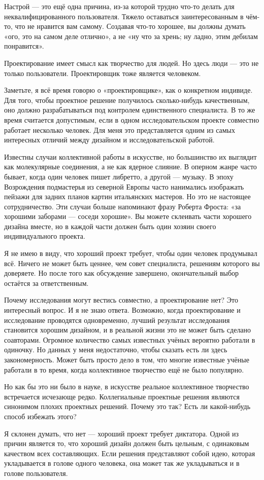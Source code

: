\documentclass[ebook,12pt,oneside,openany]{memoir}
\begin{document}
Настрой — это ещё одна причина, из-за которой трудно что-то делать для
неквалифицированного пользователя. Тяжело оставаться заинтересованным
в чём-то, что не нравится вам самому. Создавая что-то хорошее, вы
должны думать «ого, это на самом деле отлично», а не «ну что за хрень;
ну ладно, этим дебилам понравится».

Проектирование имеет смысл как творчество для людей. Но здесь люди —
это не только пользователи. Проектировщик тоже является человеком.

Заметьте, я всё время говорю о «проектировщике», как о конкретном
индивиде. Для того, чтобы проектное решение получилось сколько-нибудь
качественным, оно должно разрабатываться под контролем единственного
специалиста. В то же время считается допустимым, если в одном
исследовательском проекте совместно работает несколько человек. Для
меня это представляется одним из самых интересных отличий между
дизайном и исследовательской работой.

Известны случаи коллективной работы в искусстве, но большинство их
выглядит как молекулярные соединения, а не как ядерное слияние. В
оперном жанре часто бывает, когда один человек пишет либретто, а
другой — музыку. В эпоху Возрождения подмастерья из северной Европы
часто нанимались изображать пейзажи для задних планов картин
итальянских мастеров. Но это не настоящее сотрудничество. Эти случаи
больше напоминают фразу Роберта Фроста: «за хорошими заборами — соседи
хорошие». Вы можете склеивать части хорошего дизайна вместе, но в
каждой части должен быть один хозяин своего индивидуального проекта.

Я не имею в виду, что хороший проект требует, чтобы один человек
продумывал всё. Ничего не может быть ценнее, чем совет специалиста,
решениям которого вы доверяете. Но после того как обсуждение
завершено, окончательный выбор остаётся за ответственным.

Почему исследования могут вестись совместно, а проектирование нет? Это
интересный вопрос. И я не знаю ответа. Возможно, когда проектирование
и исследование проводятся одновременно, лучший результат исследования
становится хорошим дизайном, и в реальной жизни это не может быть
сделано соавторами. Огромное количество самых известных учёных
вероятно работали в одиночку. Но данных у меня недостаточно, чтобы
сказать есть ли здесь закономерность. Может быть просто дело в том,
что многие известные учёные работали в то время, когда коллективное
творчество ещё не было популярно.

Но как бы это ни было в науке, в искусстве реальное коллективное
творчество встречается исчезающе редко. Коллегиальные проектные
решения являются синонимом плохих проектных решений. Почему это так?
Есть ли какой-нибудь способ избежать этого?

Я склонен думать, что нет — хороший проект требует диктатора. Одной из
причин является то, что хороший дизайн должен быть цельным, с
одинаковым качеством всех составляющих. Если решения представляют
собой идею, которая укладывается в голове одного человека, она может
так же укладываться и в голове пользователя.
\end{document}
